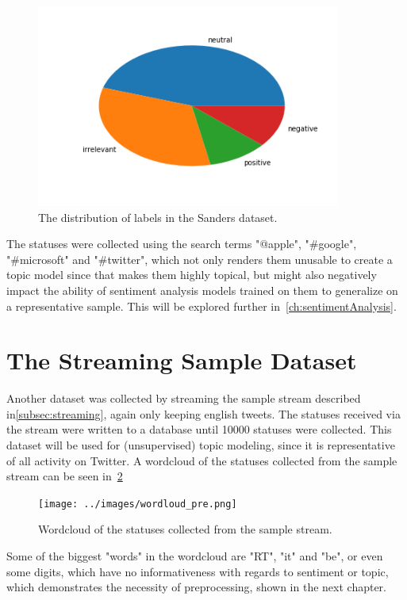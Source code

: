 \begin{figure}
    \centering
    \caption{The distribution of labels in the Sanders dataset.}
    \label{fig:sanders_sentiment}
    \includegraphics[width=10cm]{../images/sanders_sentiment.png}
\end{figure}

The statuses were collected using the search terms "@apple", "#google", "#microsoft" and "#twitter",
which not only renders them unusable to create a topic model since that makes them highly topical,
but might also negatively impact the ability of sentiment analysis models trained on them to generalize on a representative sample.
This will be explored further in~\ref{ch:sentimentAnalysis}.

\section{The Streaming Sample Dataset}
\label{sec:streamingSampleDataset}

Another dataset was collected by streaming the sample stream described in\ref{subsec:streaming},
again only keeping english tweets.
The statuses received via the stream were written to a database until 10000 statuses were collected.
This dataset will be used for (unsupervised) topic modeling, since it is representative of all activity on Twitter.
A wordcloud of the statuses collected from the sample stream can be seen in~\ref{fig:wordloud_pre}~

\begin{figure}
    \centering
    \caption{Wordcloud of the statuses collected from the sample stream.}
    \label{fig:wordloud_pre}
    \texttt{[image: ../images/wordloud\_pre.png]}
\end{figure}

Some of the biggest "words" in the wordcloud are "RT", "it" and "be",
or even some digits, which have no informativeness with regards to sentiment or topic,
which demonstrates the necessity of preprocessing, shown in the next chapter.



